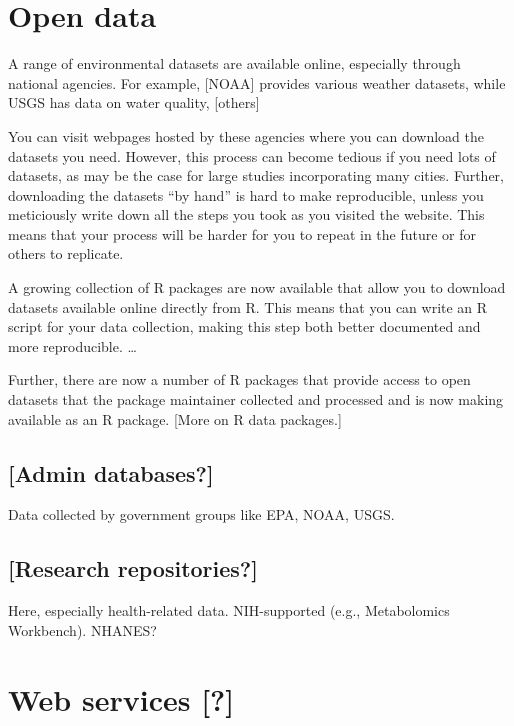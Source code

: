 \documentclass[]{tufte-book}
\begin{document}
\hypertarget{open-data}{%
\section{Open data}\label{open-data}}

A range of environmental datasets are available online, especially through national agencies.
For example, {[}NOAA{]} provides various weather datasets, while USGS has data on water quality,
{[}others{]}

You can visit webpages hosted by these agencies where you can download the datasets you need.
However, this process can become tedious if you need lots of datasets, as may be the case for
large studies incorporating many cities. Further, downloading the datasets ``by hand'' is hard
to make reproducible, unless you meticiously write down all the steps you took as you visited
the website. This means that your process will be harder for you to repeat in the future
or for others to replicate.

A growing collection of R packages are now available that allow you to download datasets
available online directly from R. This means that you can write an R script for your data
collection, making this step both better documented and more reproducible. \ldots{}

Further, there are now a number of R packages that provide access to open datasets that the
package maintainer collected and processed and is now making available as an R package.
{[}More on R data packages.{]}

\hypertarget{admin-databases}{%
\subsection{{[}Admin databases?{]}}\label{admin-databases}}

Data collected by government groups like EPA, NOAA, USGS.

\hypertarget{research-repositories}{%
\subsection{{[}Research repositories?{]}}\label{research-repositories}}

Here, especially health-related data.
NIH-supported (e.g., Metabolomics Workbench).
NHANES?

\hypertarget{web-services}{%
\section{Web services {[}?{]}}\label{web-services}}
\end{document}
